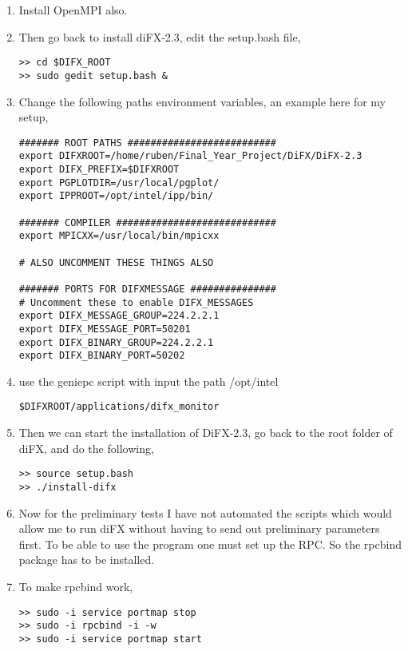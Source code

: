 \begin{enumerate}
\item Install OpenMPI also.

\item Then go back to install diFX-2.3, edit the setup.bash file,
\begin{verbatim}
>> cd $DIFX_ROOT
>> sudo gedit setup.bash &
\end{verbatim}
\item Change the following paths environment variables, an  example  here for my setup,
\begin{verbatim}
####### ROOT PATHS ##########################
export DIFXROOT=/home/ruben/Final_Year_Project/DiFX/DiFX-2.3
export DIFX_PREFIX=$DIFXROOT
export PGPLOTDIR=/usr/local/pgplot/
export IPPROOT=/opt/intel/ipp/bin/

####### COMPILER ############################
export MPICXX=/usr/local/bin/mpicxx

# ALSO UNCOMMENT THESE THINGS ALSO

####### PORTS FOR DIFXMESSAGE ###############
# Uncomment these to enable DIFX_MESSAGES
export DIFX_MESSAGE_GROUP=224.2.2.1
export DIFX_MESSAGE_PORT=50201
export DIFX_BINARY_GROUP=224.2.2.1
export DIFX_BINARY_PORT=50202

\end{verbatim}
\item use the geniepc script with input the path /opt/intel
\begin{verbatim}
$DIFXROOT/applications/difx_monitor
\end{verbatim} 



\item Then we can start the installation of DiFX-2.3, go back to the root folder of diFX, and do the following,
\begin{verbatim}
>> source setup.bash
>> ./install-difx
\end{verbatim}

\item Now for the preliminary tests I have not automated the scripts which would allow me to run diFX without having to send out preliminary parameters first. To be able to use the program one must set up the RPC. So the rpcbind package has to be installed.

\item To make rpcbind work,
\begin{verbatim}
>> sudo -i service portmap stop
>> sudo -i rpcbind -i -w
>> sudo -i service portmap start 
\end{verbatim}


\end{enumerate}
